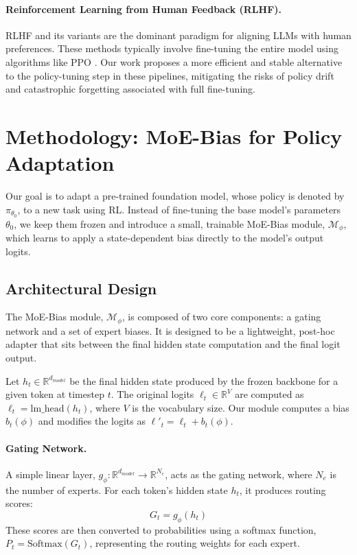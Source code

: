 \documentclass[a4paper]{article}
\begin{document}
\paragraph{Reinforcement Learning from Human Feedback (RLHF).}
RLHF \cite{...} %
and its variants are the dominant paradigm for aligning LLMs with human preferences. These methods typically involve fine-tuning the entire model using algorithms like PPO \cite{...}. %
Our work proposes a more efficient and stable alternative to the policy-tuning step in these pipelines, mitigating the risks of policy drift and catastrophic forgetting associated with full fine-tuning.


\section{Methodology: MoE-Bias for Policy Adaptation}

Our goal is to adapt a pre-trained foundation model, whose policy is denoted by $\pi_{\theta_0}$, to a new task using RL. Instead of fine-tuning the base model's parameters $\theta_0$, we keep them frozen and introduce a small, trainable MoE-Bias module, $\mathcal{M}_{\phi}$, which learns to apply a state-dependent bias directly to the model's output logits.

\subsection{Architectural Design}

The MoE-Bias module, $\mathcal{M}_{\phi}$, is composed of two core components: a gating network and a set of expert biases. It is designed to be a lightweight, post-hoc adapter that sits between the final hidden state computation and the final logit output.

Let $h_t \in \mathbb{R}^{d_{model}}$ be the final hidden state produced by the frozen backbone for a given token at timestep $t$. The original logits $\ell_t \in \mathbb{R}^{V}$ are computed as $\ell_t = \text{lm\_head}(h_t)$, where $V$ is the vocabulary size. Our module computes a bias $b_t(\phi)$ and modifies the logits as $\ell'_t = \ell_t + b_t(\phi)$.

\paragraph{Gating Network.}
A simple linear layer, $g_\phi: \mathbb{R}^{d_{model}} \to \mathbb{R}^{N_e}$, acts as the gating network, where $N_e$ is the number of experts. For each token's hidden state $h_t$, it produces routing scores:
\begin{equation}
    G_t = g_\phi(h_t)
\end{equation}
These scores are then converted to probabilities using a softmax function, $P_t = \text{Softmax}(G_t)$, representing the routing weights for each expert.
\end{document}
